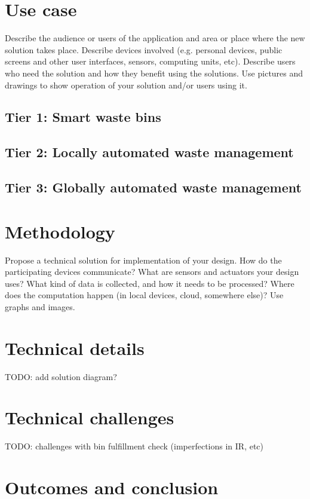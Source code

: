 \documentclass{article}
\begin{document}
\section{Use case}

Describe the audience or users of the application and area or place where the new solution takes
place. Describe devices involved (e.g. personal devices, public screens and other user interfaces,
sensors, computing units, etc). Describe users who need the solution and how they benefit using the
solutions. Use pictures and drawings to show operation of your solution and/or users using it.

\subsection{Tier 1: Smart waste bins}


\subsection{Tier 2: Locally automated waste management}

\subsection{Tier 3: Globally automated waste management}


\section{Methodology}
Propose a technical solution for implementation of your design. How do the participating devices
communicate? What are sensors and actuators your design uses? What kind of data is collected, and
how it needs to be processed? Where does the computation happen (in local devices, cloud, somewhere
else)? Use graphs and images.

\section{Technical details}
TODO: add solution diagram?

\section{Technical challenges}
TODO: challenges with bin fulfillment check (imperfections in IR, etc)

\section{Outcomes and conclusion}
\end{document}
